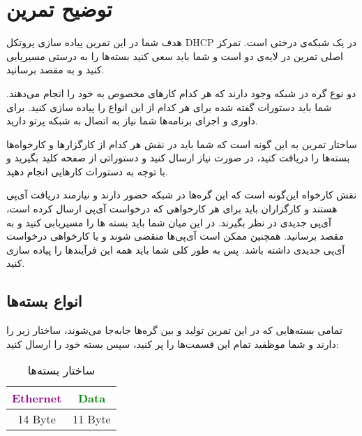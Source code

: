 \section{توضیح تمرین}
هدف شما در این تمرین پیاده سازی پروتکل DHCP در یک شبکه‌ی درختی است. تمرکز اصلی تمرین در لایه‌ی دو است و شما باید سعی کنید بسته‌ها را به درستی مسیریابی کنید و به مقصد برسانید.


دو نوع گره در شبکه وجود دارند که هر کدام کارهای مخصوص به خود را انجام می‌دهند. شما باید دستورات گفته شده برای هر کدام از این انواع را پیاده سازی کنید. برای داوری و اجرای برنامه‌ها شما نیاز به اتصال به شبکه پرتو دارید.

ساختار تمرین به این گونه است که شما باید در نقش هر کدام از کارگزار‌ها و کارخواه‌ها بسته‌ها را دریافت کنید، در صورت نیاز ارسال کنید و دستوراتی از صفحه کلید بگیرید و با توجه به دستورات کارهایی انجام دهید.

 نقش کارخواه این‌گونه است که این گره‌ها در شبکه حضور دارند و نیازمند دریافت آی‌پی هستند و کارگزاران باید برای هر کارخواهی که درخواست آی‌پی ارسال کرده است، آی‌پی جدیدی در نظر بگیرند. در این میان شما باید بسته ها را مسیریابی کنید و به مقصد برسانید. همچنین ممکن است آی‌پی‌ها منقضی شوند و یا کارخواهی درخواست آی‌پی جدیدی داشته باشد. پس به طور کلی شما باید همه این فرآیندها را پیاده سازی کنید.


\subsection{انواع بسته‌ها}
تمامی بسته‌هایی که در این تمرین تولید و بین گره‌ها جابه‌جا می‌شوند، ساختار زیر را دارند و شما موظفید تمام این قسمت‌ها را پر کنید، سپس بسته خود را ارسال کنید:

\begin{table}[htb]
\centering
  \begin{latin}
    \begin{tabular}{|c|c|}
      \hline
      
      \textcolor{purple}{Ethernet} & \textcolor{green}{Data}  \\
      \hline
      14 Byte & 11 Byte \\
      \hline
    \end{tabular}
  \end{latin}
\caption{ساختار بسته‌ها}
\end{table}

